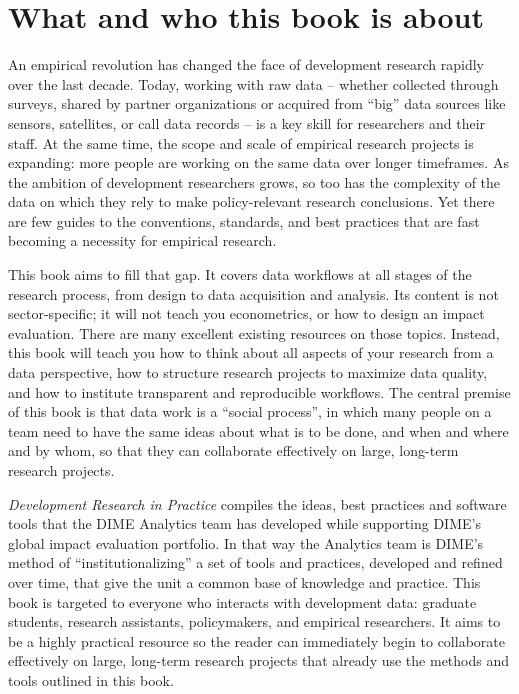 
\section{What and who this book is about}

An empirical revolution has changed the face of development research rapidly over the last decade.
Today, working with raw data --
whether collected through surveys,
shared by partner organizations
or acquired from ``big'' data sources
like sensors, satellites, or call data records --
is a key skill for researchers and their staff.
At the same time, the scope and scale of empirical research projects is expanding:
more people are working on the same data over longer timeframes.
As the ambition of development researchers grows, so too has the complexity of the data
on which they rely to make policy-relevant research conclusions.
Yet there are few guides to the conventions, standards, and best practices
that are fast becoming a necessity for empirical research.

This book aims to fill that gap.
It covers data workflows at all stages of the research process,
from design to data acquisition and analysis.
Its content is not sector-specific;
it will not teach you econometrics,
or how to design an impact evaluation.
There are many excellent existing resources on those topics.
Instead, this book will teach you how to think about all aspects of your research from a data perspective,
how to structure research projects to maximize data quality,
and how to institute transparent and reproducible workflows.
The central premise of this book is that data work is a ``social process'',
in which many people on a team need to have the same ideas
about what is to be done, and when and where and by whom,
so that they can collaborate effectively on large, long-term research projects.

\textit{Development Research in Practice} compiles the ideas, best practices and software tools
that the DIME Analytics team
has developed while supporting DIME's global impact evaluation portfolio.
In that way the Analytics team is DIME's method of ``institutionalizing''
a set of tools and practices, developed and refined over time,
that give the unit a common base of knowledge and practice.
This book is targeted to everyone who interacts with development data:
graduate students, research assistants, policymakers, and empirical researchers.
It aims to be a highly practical resource so the reader can
immediately begin to collaborate effectively on large, long-term research projects
that already use the methods and tools outlined in this book.

